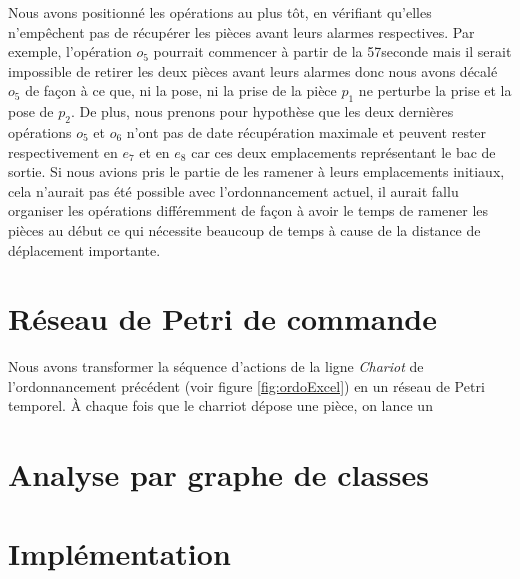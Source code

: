 Nous avons positionné les opérations au plus tôt, en vérifiant qu'elles n'empêchent pas de récupérer les pièces avant leurs alarmes respectives. Par exemple, l'opération $o_5$ pourrait commencer à partir de la 57\ieme seconde mais il serait impossible de retirer les deux pièces avant leurs alarmes donc nous avons décalé $o_5$ de façon à ce que, ni la pose, ni la prise de la pièce $p_1$ ne perturbe la prise et la pose de $p_2$. De plus, nous prenons pour hypothèse que les deux dernières opérations $o_5$ et $o_6$ n'ont pas de date récupération maximale et peuvent rester respectivement en $e_7$ et en $e_8$ car ces deux emplacements représentant le bac de sortie. Si nous avions pris le partie de les ramener à leurs emplacements initiaux, cela n'aurait pas été possible avec l'ordonnancement actuel, il aurait fallu organiser les opérations différemment de façon à avoir le temps de ramener les pièces au début ce qui nécessite beaucoup de temps à cause de la distance de déplacement importante.

\section{Réseau de Petri de commande}
Nous avons transformer la séquence d'actions de la ligne \emph{Chariot} de l'ordonnancement précédent (voir figure \ref{fig:ordoExcel}) en un réseau de Petri temporel. À chaque fois que le charriot dépose une pièce, on lance un
\section{Analyse par graphe de classes}

\section{Implémentation}